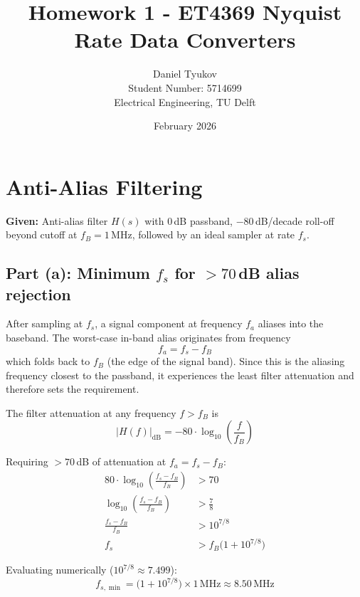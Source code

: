 \documentclass{article}
\title{Homework 1 - ET4369 Nyquist Rate Data Converters}
\author{Daniel Tyukov \\ Student Number: 5714699 \\ Electrical Engineering, TU Delft}
\date{February 2026}
\begin{document}
\maketitle

\tableofcontents

  \section{Anti-Alias Filtering}

  \textbf{Given:} Anti-alias filter $H(s)$ with $0$\,dB passband, $-80$\,dB/decade roll-off beyond cutoff at $f_B = 1$\,MHz,
  followed by an ideal sampler at rate $f_s$.

  \subsection{Part (a): Minimum $f_s$ for $>70$\,dB alias rejection}

  After sampling at $f_s$, a signal component at frequency $f_a$ aliases into the baseband. The worst-case in-band alias
  originates from frequency
  \begin{equation}
      f_a = f_s - f_B
  \end{equation}
  which folds back to $f_B$ (the edge of the signal band). Since this is the aliasing frequency closest to the passband, it
  experiences the least filter attenuation and therefore sets the requirement.

  The filter attenuation at any frequency $f > f_B$ is
  \begin{equation}
      \bigl|H(f)\bigr|_{\mathrm{dB}} = -80 \cdot \log_{10}\!\left(\frac{f}{f_B}\right)
  \end{equation}

  Requiring $>70$\,dB of attenuation at $f_a = f_s - f_B$:
  \begin{align}
      80 \cdot \log_{10}\!\left(\frac{f_s - f_B}{f_B}\right) &> 70 \\[6pt]
      \log_{10}\!\left(\frac{f_s - f_B}{f_B}\right) &> \frac{7}{8} \\[6pt]
      \frac{f_s - f_B}{f_B} &> 10^{7/8} \\[6pt]
      f_s &> f_B\bigl(1 + 10^{7/8}\bigr)
  \end{align}

  Evaluating numerically ($10^{7/8} \approx 7.499$):
  \begin{equation}
      \boxed{f_{s,\min} = \bigl(1 + 10^{7/8}\bigr) \times 1\,\text{MHz} \approx 8.50\,\text{MHz}}
  \end{equation}
\end{document}
